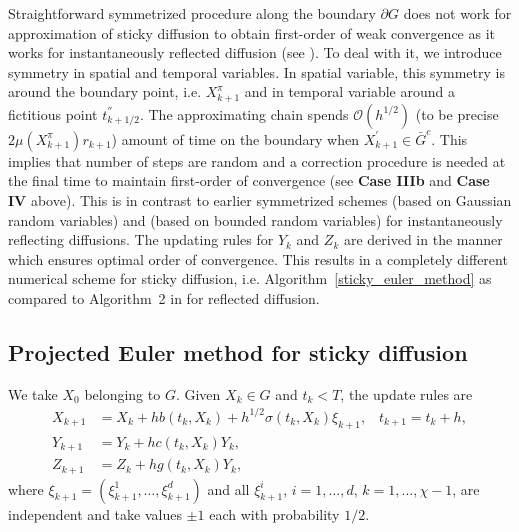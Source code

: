 \documentclass{article}
\theoremstyle{definition}
\numberwithin{equation}{section}
\begin{document}
 Straightforward symmetrized procedure along the boundary $\partial G$ does not work for approximation of sticky diffusion to obtain first-order of weak convergence as it works for instantaneously reflected diffusion (see \cite{2, leimkuhler2023simplerandom}). To deal with it, we introduce symmetry in spatial and temporal variables. In spatial variable, this symmetry is around the boundary point, i.e. $X_{k+1}^{\pi}$ and  in temporal variable around a fictitious point $t_{k+1/2}^{''}$. The approximating chain spends $\mathcal{O}(h^{1/2})$ (to be precise $2\mu(X_{k+1}^{\pi}) r_{k+1}$) amount of time on the boundary when $X_{k+1}^{'} \in \bar{G}^{c}$. This implies that number of steps are random and a correction procedure is needed at the final time to maintain first-order of convergence (see \textbf{Case IIIb} and \textbf{Case IV} above). This is in contrast to earlier symmetrized schemes \cite{2} (based on Gaussian random variables) and \cite{leimkuhler2023simplerandom} (based on bounded random variables) for instantaneously reflecting diffusions.  The updating rules for $Y_{k}$ and $Z_{k}$ are  derived in the manner which  ensures optimal order of convergence.  This results in a completely different numerical scheme for sticky diffusion, i.e. Algorithm~\ref{sticky_euler_method} as compared to Algorithm~2 in \cite{leimkuhler2023simplerandom} for reflected diffusion.


\subsection{Projected Euler method for sticky diffusion}\label{subsection3.1}
 We take $X_0 $ belonging to $G$. Given $X_k \in G$ and $t_k < T$, the update rules are
\begin{align}
X_{k+1} &= X_{k } + hb(t_k, X_{k}) + h^{1/2}\sigma(t_k, X_k)\xi_{k+1}, \;\;\; t_{k+1} = t_{k} + h,\label{stickyproj_eulerscheme_x}\\ 
Y_{k+1} &= Y_{k} + hc(t_{k},X_{k})Y_{k},\label{stickyproj_eulerscheme_y} \\
Z_{k+1} &= Z_{k} + hg(t_{k},X_{k})Y_{k},\label{stickyProj_eulerscheme_z} 
\end{align}
where $ \xi_{k+1} = (\xi_{k+1}^{1}, \dots, \xi_{k+1}^{d})$ and all $\xi_{k+1}^{i}$, $i=1,\dots,d$, $k = 1, \dots, \chi-1$, are independent and take values $\pm 1$ each with probability $1/2$. 
\end{document}
